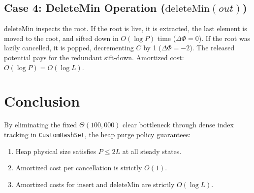 \documentclass[11pt,a4paper]{article}
\begin{document}
\subsection{Case 4: DeleteMin Operation ($\text{deleteMin}(out)$)}
$\text{deleteMin}$ inspects the root. If the root is live, it is extracted, the last element is moved to the root, and sifted down in $O(\log P)$ time ($\Delta\Phi = 0$). If the root was lazily cancelled, it is popped, decrementing $C$ by 1 ($\Delta\Phi = -2$). The released potential pays for the redundant sift-down. Amortized cost: $O(\log P) = O(\log L)$.

\section{Conclusion}
By eliminating the fixed $\Theta(100{,}000)$ clear bottleneck through dense index tracking in \texttt{CustomHashSet}, the heap purge policy guarantees:
\begin{enumerate}
    \item Heap physical size satisfies $P \le 2L$ at all steady states.
    \item Amortized cost per cancellation is strictly $O(1)$.
    \item Amortized costs for $\text{insert}$ and $\text{deleteMin}$ are strictly $O(\log L)$.
\end{enumerate}
\end{document}
